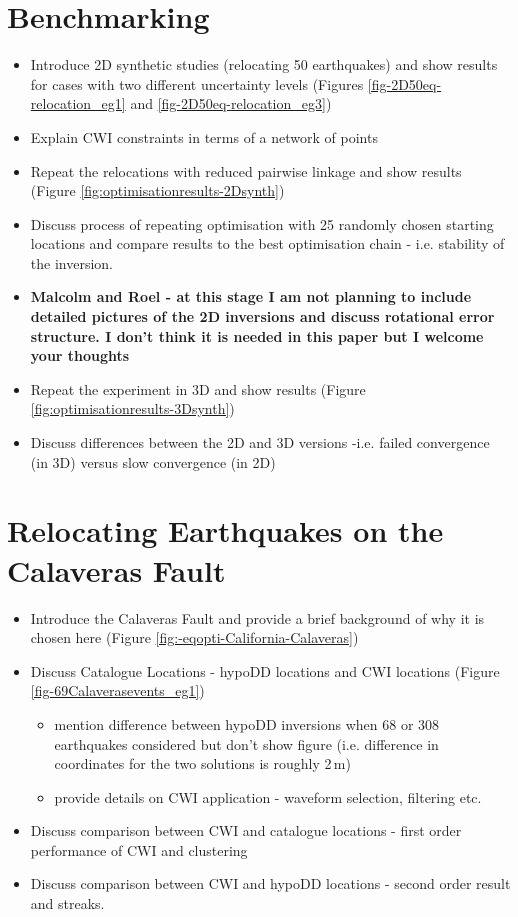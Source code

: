\documentclass[draft,jgrga]{agutex}
\begin{document}
\begin{article}
\section{Benchmarking}
\begin{itemize}
\item Introduce 2D synthetic studies (relocating 50 earthquakes) and show results for cases with
two different uncertainty levels (Figures \ref{fig-2D50eq-relocation_eg1} and
\ref{fig-2D50eq-relocation_eg3})
\item Explain CWI constraints in terms of a network of points
\item Repeat the relocations with reduced pairwise linkage and show results
(Figure \ref{fig:optimisationresults-2Dsynth})
\item Discuss process of repeating optimisation with 25 randomly chosen starting locations
 and compare results to the best optimisation chain - i.e. stability of the inversion.
\item \textbf{Malcolm and Roel - at this stage I am not planning to include detailed pictures of the 2D
inversions and discuss rotational error structure. I don't think it is needed in this paper but I welcome your thoughts}
\item Repeat the experiment in 3D and show results
(Figure \ref{fig:optimisationresults-3Dsynth})
\item Discuss differences between the 2D and 3D versions -i.e. failed convergence (in 3D) versus slow convergence (in 2D)
\end{itemize}

\section{Relocating Earthquakes on the Calaveras Fault}
\begin{itemize}
\item Introduce the Calaveras Fault and provide a brief background of why it is chosen here (Figure \ref{fig:-eqopti-California-Calaveras})
\item Discuss Catalogue Locations - hypoDD locations and CWI locations
(Figure \ref{fig-69Calaverasevents_eg1})
\begin{itemize}
\item mention difference between hypoDD inversions when 68 or
308 earthquakes considered but don't show figure (i.e. difference in coordinates for
the two solutions is roughly 2\,m)
\item provide details on CWI application - waveform selection, filtering etc.
\end{itemize}
\item Discuss comparison between CWI and catalogue locations - first order performance of CWI and clustering
\item Discuss comparison between CWI and hypoDD locations - second order result and streaks.
\end{itemize}


\end{article}
\end{document}

